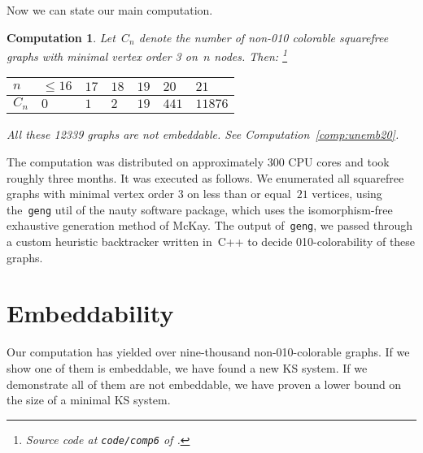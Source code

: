 \documentclass{report}
\newtheorem{comp}{Computation}[section]
\begin{document}
Now we can state our main computation.
\begin{comp}
    Let~$C_n$ denote the number of non-010 colorable squarefree
    graphs with minimal vertex order 3 on~$n$ nodes.  Then:%
        \footnote{Source code at \texttt{code/comp6} of \cite{GH}.}

    \begin{center}
    \begin{tabular}{l|llllll}
        $n$ & $\leq 16$
            & $17$
            & $18$
            & $19$
            & $20$
            & $21$ \\
        \hline
        $C_n$ & $0$
            & $1$
            & $2$
            & $19$
            & $441$
            & $11876$
    \end{tabular}
    \end{center}

    All these 12339 graphs are not embeddable.
    See Computation~\ref{comp:unemb20}.
\end{comp}
The computation was distributed on approximately 300 CPU cores
and took roughly three months.
It was executed as follows.
We enumerated all squarefree graphs with minimal vertex
order 3 on less than or equal~$21$ vertices,
using the~\texttt{geng} util of the nauty software package,
which uses the isomorphism-free exhaustive generation
method of McKay\cite{geng}.
The output of~\texttt{geng}, we passed through
a custom heuristic backtracker written in~C++
to decide 010-colorability of these graphs.

\section{Embeddability}\label{sec:emb}
Our computation has yielded over nine-thousand non-010-colorable graphs.
If we show one of them is embeddable, we have found a new KS system.
If we demonstrate all of them are not embeddable, we have
proven a lower bound on the size of a minimal KS system.
\end{document}
